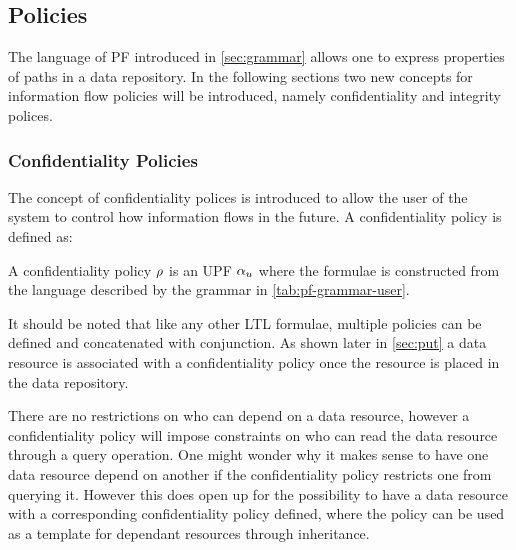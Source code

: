 \subsection{Policies}\label{sec:policies}
The language of PF introduced in \autoref{sec:grammar} allows one to express properties of paths in a data repository. In the following sections two new concepts for information flow policies will be introduced, namely confidentiality and integrity polices.

\subsubsection{Confidentiality Policies}
The concept of confidentiality polices is introduced to allow the user of the system to control how information flows in the future. A confidentiality policy is defined as:
\begin{definition}\label{def:cp}
A confidentiality policy $\rho$ is an UPF $\alpha_u$ where the formulae is constructed from the language described by the grammar in \autoref{tab:pf-grammar-user}.
\end{definition}
It should be noted that like any other LTL formulae, multiple policies can be defined and concatenated with conjunction. As shown later in \autoref{sec:put} a data resource is associated with a confidentiality policy once the resource is placed in the data repository. 

There are no restrictions on who can depend on a data resource, however a confidentiality policy will impose constraints on who can read the data resource through a query operation. One might wonder why it makes sense to have one data resource depend on another if the confidentiality policy restricts one from querying it. However this does open up for the possibility to have a data resource with a corresponding confidentiality policy defined, where the policy can be used as a template for dependant resources through inheritance.

